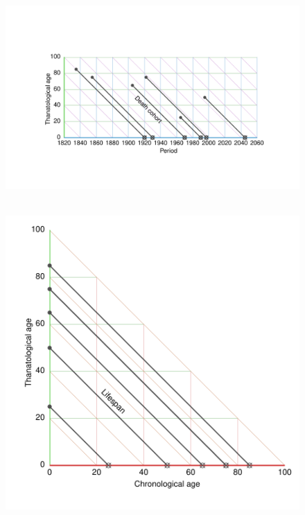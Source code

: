 \documentclass[12pt,oneside,a4paper,doublespacing]{article} %
\theoremstyle{definition}
\begin{document}
\begin{figure}[h!] 
\caption{~}
\includegraphics[scale=0.8]{TPDrt.pdf}
\end{figure} 

\begin{figure}[h!] 
\caption{~}
\centering
\includegraphics[scale=0.7]{TALrt.pdf}
\end{figure} 
\end{document}
